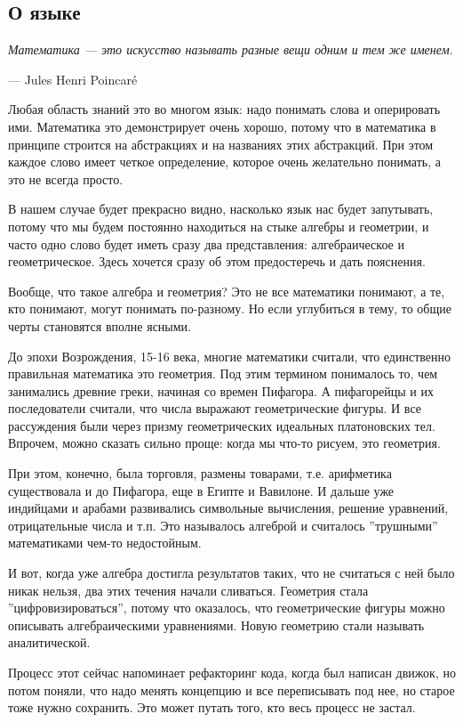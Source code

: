 \documentclass[a4paper,12pt]{article}
\begin{document}
\subsection*{О языке}
\epigraph{\textit{Математика — это искусство называть разные вещи одним и тем же именем.}}{— Jules Henri Poincaré}
Любая область знаний это во многом язык: надо понимать слова и оперировать ими. Математика это демонстрирует очень хорошо, потому что в математика в принципе строится на абстракциях и на названиях этих абстракций. При этом каждое слово имеет четкое определение, которое очень желательно понимать, а это не всегда просто.

В нашем случае будет прекрасно видно, насколько язык нас будет запутывать, потому что мы будем постоянно находиться на стыке алгебры и геометрии, и часто одно слово будет иметь сразу два представления: алгебраическое и геометрическое. Здесь хочется сразу об этом предостеречь и дать пояснения.

Вообще, что такое алгебра и геометрия? Это не все математики понимают, а те, кто понимают, могут понимать по-разному. Но если углубиться в тему, то общие черты становятся вполне ясными.

До эпохи Возрождения, 15-16 века, многие математики считали, что единственно правильная математика это геометрия. Под этим термином понималось то, чем занимались древние греки, начиная со времен Пифагора. А пифагорейцы и их последователи считали, что числа выражают геометрические фигуры. И все рассуждения были через призму геометрических идеальных платоновских тел. Впрочем, можно сказать сильно проще: когда мы что-то рисуем, это геометрия.

При этом, конечно, была торговля, размены товарами, т.е. арифметика существовала и до Пифагора, еще в Египте и Вавилоне. И дальше уже индийцами и арабами развивались символьные вычисления, решение уравнений, отрицательные числа и т.п. Это называлось алгеброй и считалось ''трушными'' математиками чем-то недостойным.

И вот, когда уже алгебра достигла результатов таких, что не считаться с ней было никак нельзя, два этих течения начали сливаться. Геометрия стала ''цифровизироваться'', потому что оказалось, что геометрические фигуры можно описывать алгебраическими уравнениями. Новую геометрию стали называть аналитической.

Процесс этот сейчас напоминает рефакторинг кода, когда был написан движок, но потом поняли, что надо менять концепцию и все переписывать под нее, но старое тоже нужно сохранить. Это может путать того, кто весь процесс не застал.
\end{document}
